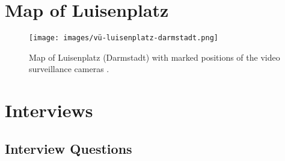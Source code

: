 \documentclass[12pt]{article}
\begin{document}
	
	
	
	\clearpage
	
	\printbibliography
	
	\clearpage
	
	\begin{appendices}
		\section{Map of Luisenplatz}
		\label{sec:luisenplatz-map}
		
		\begin{figure}[H]
			\centering
			\texttt{[image: images/vü-luisenplatz-darmstadt.png]} 
			\caption{Map of Luisenplatz (Darmstadt) with marked positions of the video surveillance cameras \parencite{magistratsbeschluss_luisenplatz_2020}.}
		\end{figure}
		
		\clearpage
		
		\section{Interviews}
		\label{app:interviews}
		
		\subsection{Interview Questions}
		

\end{appendices}
\end{document}
